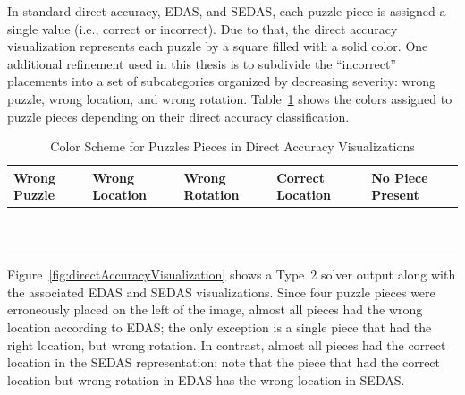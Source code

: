 \documentclass{report}
\begin{document}
In standard direct accuracy, EDAS, and SEDAS, each puzzle piece is assigned a single value (i.e., correct or incorrect).  Due to that, the direct accuracy visualization represents each puzzle by a square filled with a solid color.  One additional refinement used in this thesis is to subdivide the ``incorrect'' placements into a set of subcategories organized by decreasing severity: wrong puzzle, wrong location, and wrong rotation.  Table~\ref{tab:directAccuracyColors} shows the colors assigned to puzzle pieces depending on their direct accuracy classification.

\begin{table}[h]
	\begin{center}
  		\begin{tabular}{ | >{\centering\arraybackslash}m{0.6in} | >{\centering\arraybackslash}m{0.6in} | >{\centering\arraybackslash}m{0.6in} | >{\centering\arraybackslash}m{0.6in} | >{\centering\arraybackslash}m{0.6in} | }
 \hline
    		Wrong Puzzle & Wrong Location & Wrong Rotation & Correct Location  & No Piece Present  \\ \hline
			{\cellcolor{blue}~} & {\cellcolor{red}~}  & {\cellcolor{orange}~}  & {\cellcolor{green}~} & {\cellcolor{black}~}  \\
			{\cellcolor{blue}~} & {\cellcolor{red}~}  & {\cellcolor{orange}~}  & {\cellcolor{green}~} & {\cellcolor{black}~} \\
 \hline
		\end{tabular}
	\end{center}
\caption{Color Scheme for Puzzles Pieces in Direct Accuracy Visualizations}\label{tab:directAccuracyColors}
\end{table}

Figure~\ref{fig:directAccuracyVisualization} shows a Type~2 solver output along with the associated EDAS and SEDAS visualizations. Since four puzzle pieces were erroneously placed on the left of the image, almost all pieces had the wrong location according to EDAS; the only exception is a single piece that had the right location, but wrong rotation.  In contrast, almost all pieces had the correct location in the SEDAS representation; note that the piece that had the correct location but wrong rotation in EDAS has the wrong location in SEDAS.
\end{document}
